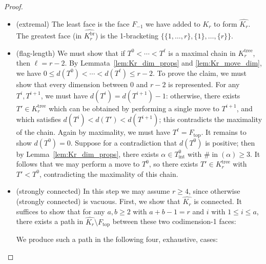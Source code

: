 \documentclass[11pt]{amsart}
\theoremstyle{definition}
\theoremstyle{remark}
\theoremstyle{plain}
\newcommand{\on}{\operatorname}
\newcommand{\incom}{\on{in}}
\newcommand{\inte}{{\on{int}}}
\newcommand{\tree}{{\on{tree}}}
\newcommand{\br}{{\on{br}}}
\renewcommand{\top}{{\on{top}}}
\newcommand{\wh}{\widehat}
\begin{document}
\begin{proof}
\begin{itemize}
\item[] {\sc (extremal)}
The least face is the face $F_{-1}$ we have added to $K_r$ to form $\wh{K_r}$.
The greatest face (in $\wh{K_r^\br}$) is the 1-bracketing $\bigl\{\{1,\ldots,r\},\{1\},\ldots,\{r\}\bigl\}$.

\medskip

\item[] {\sc (flag-length)}
We must show that if $T^0 < \cdots < T^\ell$ is a maximal chain in $K_r^\tree$, then $\ell = r-2$.
By Lemmata~\ref{lem:Kr_dim_props} and \ref{lem:Kr_move_dim}, we have $0 \leq d(T^0) < \cdots < d(T^\ell) \leq r-2$.
To prove the claim, we must show that every dimension between 0 and $r-2$ is represented.
For any $T^i, T^{i+1}$, we must have $d(T^i) = d(T^{i+1}) - 1$: otherwise, there exists $T' \in K_r^\tree$ which can be obtained by performing a single move to $T^{i+1}$, and which satisfies $d(T^i) < d(T') < d(T^{i+1})$; this contradicts the maximality of the chain.
Again by maximality, we must have $T^\ell = F_\top$.
It remains to show $d(T^0) = 0$.
Suppose for a contradiction that $d(T^0)$ is positive; then by Lemma~\ref{lem:Kr_dim_props}, there exists $\alpha \in T^0_\inte$ with $\#\!\incom(\alpha) \geq 3$.
It follows that we may perform a move to $T^0$, so there exists $T' \in K_r^\tree$ with $T' < T^0$, contradicting the maximality of this chain.

\medskip

\item[] {\sc (strongly connected)}
In this step we may assume $r \geq 4$, since otherwise {\sc(strongly connected)} is vacuous.
First, we show that $\wh{K_r}$ is connected.
It suffices to show that for any $a, b \geq 2$ with $a + b - 1 = r$ and $i$ with $1 \leq i \leq a$, there exists a path in $\wh{K_r} \setminus F_\top$ between these two codimension-1 faces:

\begin{figure}[H]
\centering
\def\svgwidth{0.38\columnwidth}

\end{figure}

\noindent We produce such a path in the following four, exhaustive, cases:

\begin{figure}[H]
\centering
\def\svgwidth{0.7\columnwidth}

\end{figure}

\begin{figure}[H]
\centering
\def\svgwidth{0.65\columnwidth}

\end{figure}


\end{itemize}
\end{proof}
\end{document}
